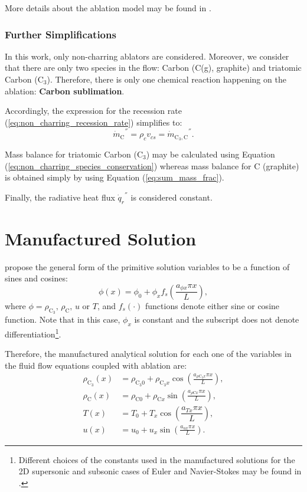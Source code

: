 \documentclass[10pt]{article}
\newcommand{\C}{\text{C}}
\begin{document}
More details about the ablation model may be found in \citet{Rochan2010,Rochan2010b}.

\subsubsection{Further Simplifications}

In this work, only non-charring ablators are considered. Moreover, we consider that there are only two species in the flow: Carbon (C(g), graphite) and triatomic Carbon (C$_3$). Therefore, there is only one chemical reaction happening on the ablation: \textbf{Carbon sublimation}.

Accordingly, the expression for the recession rate (\ref{eq:non_charring_recession_rate}) simplifies to:
\begin{equation}\label{eq:non_charring_recession_rate2}
 {\dot{m}_\C}^{''} = \rho_{c} v_{cs} =  {\dot{m}_{\C_3,\C}}^{''}.
\end{equation}

Mass balance for triatomic Carbon (C$_3$) may be calculated using Equation (\ref{eq:non_charring_species_conservation}) whereas mass balance for C (graphite) is obtained simply by using Equation (\ref{eq:sum_mass_frac}).

Finally, the radiative heat flux $ {\dot{q}_r}^{''}$ is considered constant.

\section{Manufactured Solution}

\citet{Roy2002} propose the general form of the primitive solution variables to be a function of sines and cosines:
\begin{equation}
 \label{eq:manufactured01}
 \phi (x) = \phi_0+ \phi_x f_s\left(\frac{a_{\phi x} \pi x}{L}\right) ,
\end{equation}
where $\phi=\rho_{\C_3},\, \rho_\C, \, u$ or $T$, and $f_s(\cdot)$ functions denote either sine or cosine function. Note that in this case, $\phi_x$ is constant and the subscript does not denote differentiation\footnote{Different choices of the constants used in the manufactured solutions for the 2D supersonic and subsonic cases of Euler and Navier-Stokes may be found in \citet{Roy2002}.}.

Therefore, the manufactured analytical solution for each one of the variables in the fluid flow equations coupled with ablation  are:
\begin{equation}
\begin{split}
\label{eq:manufactured02}
\rho_{\C_3}(x) &= \rho_{\C_3 0}+ \rho_{\C_3 x} \cos\left(\frac{a_{ \rho \C_3 x } \pi x}{L}\right),\\
\rho_{\C}(x) &= \rho_{\C0} + \rho_{\C x} \sin\left(\frac{a_{  \rho \C x }\pi x}{L}\right),\\
T(x)&= T_0+T_x \cos\left(\dfrac{a_{Tx} \pi x}{L}\right),\\
u\left(x\right) &= u_{0}+u_{x} \sin\left(\frac{a_{u x} \pi x}{L}\right).
\end{split}
\end{equation}
\end{document}
